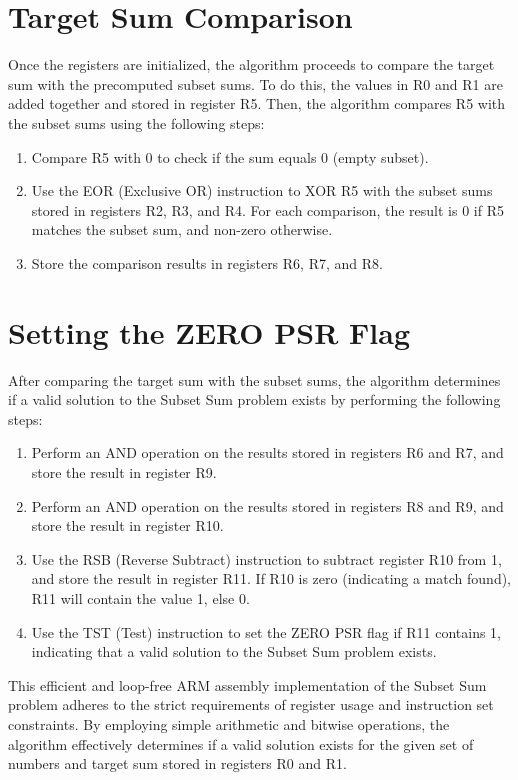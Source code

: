\section{Target Sum Comparison}

Once the registers are initialized, the algorithm proceeds to compare the target sum with the precomputed subset sums. To do this, the values in R0 and R1 are added together and stored in register R5. Then, the algorithm compares R5 with the subset sums using the following steps:

\begin{enumerate}
    \item Compare R5 with 0 to check if the sum equals 0 (empty subset).
    \item Use the EOR (Exclusive OR) instruction to XOR R5 with the subset sums stored in registers R2, R3, and R4. For each comparison, the result is 0 if R5 matches the subset sum, and non-zero otherwise.
    \item Store the comparison results in registers R6, R7, and R8.
\end{enumerate}

\section{Setting the ZERO PSR Flag}

After comparing the target sum with the subset sums, the algorithm determines if a valid solution to the Subset Sum problem exists by performing the following steps:

\begin{enumerate}
    \item Perform an AND operation on the results stored in registers R6 and R7, and store the result in register R9.
    \item Perform an AND operation on the results stored in registers R8 and R9, and store the result in register R10.
    \item Use the RSB (Reverse Subtract) instruction to subtract register R10 from 1, and store the result in register R11. If R10 is zero (indicating a match found), R11 will contain the value 1, else 0.
    \item Use the TST (Test) instruction to set the ZERO PSR flag if R11 contains 1, indicating that a valid solution to the Subset Sum problem exists.
\end{enumerate}

This efficient and loop-free ARM assembly implementation of the Subset Sum problem adheres to the strict requirements of register usage and instruction set constraints. By employing simple arithmetic and bitwise operations, the algorithm effectively determines if a valid solution exists for the given set of numbers and target sum stored in registers R0 and R1.



